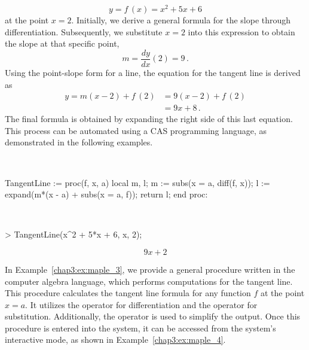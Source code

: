 %
\begin{equation*}
  y = f\,(x) = x^2 + 5x + 6
\end{equation*}
%
at the point $x = 2$. Initially, we derive a general formula for the slope through differentiation. Subsequently, we substitute $x = 2$ into this expression to obtain the slope at that specific point,
%
\begin{equation*}
  m = \dfrac{dy}{dx}(2) = 9 \, \text{.}
\end{equation*}
%
Using the point-slope form for a line, the equation for the tangent line is derived as
%
\begin{equation*}
  \begin{aligned}
    y = m(x - 2) + f\,(2) &= 9(x - 2) + f\,(2) \\
    &= 9x + 8 \, \text{.}
  \end{aligned}
\end{equation*}
%
The final formula is obtained by expanding the right side of this last equation. This process can be automated using a \ac{CAS} programming language, as demonstrated in the following examples.
%
\begin{example} \phantom{.} \\
  \label{chap3:ex:maple_3}
  \begin{mapleinline}
TangentLine := proc(f, x, a)
  local m, l;
  m := subs(x = a,  diff(f, x));
  l := expand(m*(x - a) + subs(x = a, f));
  return l;
end proc:
  \end{mapleinline}
\end{example}
%
\begin{example} \phantom{.} \\
  \label{chap3:ex:maple_4}
  \begin{mapleinline}
> TangentLine(x^2 + 5*x + 6, x, 2);
    \end{mapleinline}
    \begin{equation*}
      9x + 2
    \end{equation*}
\end{example}
%
In Example~\ref{chap3:ex:maple_3}, we provide a general procedure written in the \Maple{} computer algebra language, which performs computations for the tangent line. This procedure calculates the tangent line formula for any function $f$ at the point $x = a$. It utilizes the  operator for differentiation and the  operator for substitution. Additionally, the  operator is used to simplify the output. Once this procedure is entered into the \Maple{} system, it can be accessed from the system's interactive mode, as shown in Example~\ref{chap3:ex:maple_4}.



